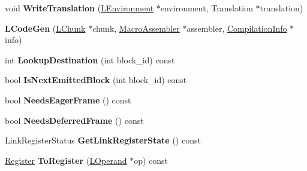 \begin{DoxyCompactItemize}
\item 
void {\bfseries Write\+Translation} (\hyperlink{classv8_1_1internal_1_1_l_environment}{L\+Environment} $\ast$environment, Translation $\ast$translation)\hypertarget{classv8_1_1internal_1_1_l_code_gen_aa6c0dc6868c8926d71543f7d35675b7f}{}\label{classv8_1_1internal_1_1_l_code_gen_aa6c0dc6868c8926d71543f7d35675b7f}

\item 
{\bfseries L\+Code\+Gen} (\hyperlink{classv8_1_1internal_1_1_l_chunk}{L\+Chunk} $\ast$chunk, \hyperlink{classv8_1_1internal_1_1_macro_assembler}{Macro\+Assembler} $\ast$assembler, \hyperlink{classv8_1_1internal_1_1_compilation_info}{Compilation\+Info} $\ast$info)\hypertarget{classv8_1_1internal_1_1_l_code_gen_aed907f71b0a7b9401ce1c0c883ed449b}{}\label{classv8_1_1internal_1_1_l_code_gen_aed907f71b0a7b9401ce1c0c883ed449b}

\item 
int {\bfseries Lookup\+Destination} (int block\+\_\+id) const \hypertarget{classv8_1_1internal_1_1_l_code_gen_aed7b32e45855e787600f16ad151865c4}{}\label{classv8_1_1internal_1_1_l_code_gen_aed7b32e45855e787600f16ad151865c4}

\item 
bool {\bfseries Is\+Next\+Emitted\+Block} (int block\+\_\+id) const \hypertarget{classv8_1_1internal_1_1_l_code_gen_a679c74faee0e58ff843fdfa52dc927a9}{}\label{classv8_1_1internal_1_1_l_code_gen_a679c74faee0e58ff843fdfa52dc927a9}

\item 
bool {\bfseries Needs\+Eager\+Frame} () const \hypertarget{classv8_1_1internal_1_1_l_code_gen_a3487a9e332e1674eeac175bdd43851bd}{}\label{classv8_1_1internal_1_1_l_code_gen_a3487a9e332e1674eeac175bdd43851bd}

\item 
bool {\bfseries Needs\+Deferred\+Frame} () const \hypertarget{classv8_1_1internal_1_1_l_code_gen_aecf1941fcb8a169141d3e26237c64c67}{}\label{classv8_1_1internal_1_1_l_code_gen_aecf1941fcb8a169141d3e26237c64c67}

\item 
Link\+Register\+Status {\bfseries Get\+Link\+Register\+State} () const \hypertarget{classv8_1_1internal_1_1_l_code_gen_a4330f8a3b7244a39a610c44efa066045}{}\label{classv8_1_1internal_1_1_l_code_gen_a4330f8a3b7244a39a610c44efa066045}

\item 
\hyperlink{structv8_1_1internal_1_1_register}{Register} {\bfseries To\+Register} (\hyperlink{classv8_1_1internal_1_1_l_operand}{L\+Operand} $\ast$op) const \hypertarget{classv8_1_1internal_1_1_l_code_gen_ab3dda8b86a7b8303006365eb51069db1}{}\label{classv8_1_1internal_1_1_l_code_gen_ab3dda8b86a7b8303006365eb51069db1}


\end{DoxyCompactItemize}
